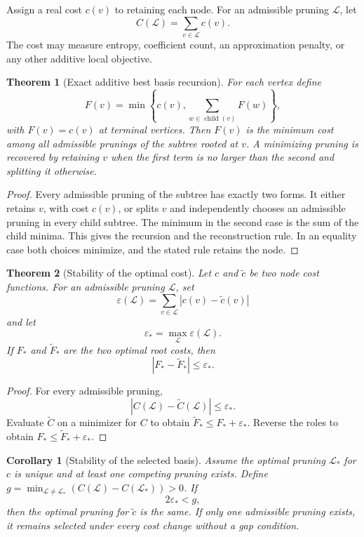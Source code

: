 \documentclass[11pt,letterpaper]{article}
\newtheorem{theorem}{Theorem}[section]
\theoremstyle{plain}
\theoremstyle{plain}
\theoremstyle{plain}
\newtheorem{corollary}[corollary]{Corollary}
\theoremstyle{definition}
\theoremstyle{definition}
\theoremstyle{definition}
\theoremstyle{definition}
\theoremstyle{remark}
\theoremstyle{remark}
\theoremstyle{remark}
\theoremstyle{remark}
\newcommand{\Lcal}{\mathcal L}
\begin{document}
Assign a real cost \(c(v)\) to retaining each node. For an admissible pruning \(\Lcal\), let
\[
C(\Lcal)=\sum_{v\in\Lcal}c(v).
\]
The cost may measure entropy, coefficient count, an approximation penalty, or any other additive local objective.

\begin{theorem}[Exact additive best basis recursion]\label{thm:best_basis}
For each vertex define
\[
F(v)
=
\min\left\{
 c(v),
 \sum_{w\in\operatorname{child}(v)}F(w)
\right\},
\]
with \(F(v)=c(v)\) at terminal vertices. Then \(F(v)\) is the minimum cost among all admissible prunings of the subtree rooted at \(v\). A minimizing pruning is recovered by retaining \(v\) when the first term is no larger than the second and splitting it otherwise.
\end{theorem}

\begin{proof}
Every admissible pruning of the subtree has exactly two forms. It either retains \(v\), with cost \(c(v)\), or splits \(v\) and independently chooses an admissible pruning in every child subtree. The minimum in the second case is the sum of the child minima. This gives the recursion and the reconstruction rule. In an equality case both choices minimize, and the stated rule retains the node.
\end{proof}

\begin{theorem}[Stability of the optimal cost]\label{thm:best_basis_cost_stability}
Let \(c\) and \(\widetilde c\) be two node cost functions. For an admissible pruning \(\Lcal\), set
\[
\varepsilon(\Lcal)
=
\sum_{v\in\Lcal}|c(v)-\widetilde c(v)|
\]
and let
\[
\varepsilon_*
=
\max_{\Lcal}\varepsilon(\Lcal).
\]
If \(F_*\) and \(\widetilde F_*\) are the two optimal root costs, then
\[
|F_*-\widetilde F_*|
\leq
\varepsilon_*.
\]
\end{theorem}

\begin{proof}
For every admissible pruning,
\[
|C(\Lcal)-\widetilde C(\Lcal)|
\leq
\varepsilon_*.
\]
Evaluate \(\widetilde C\) on a minimizer for \(C\) to obtain \(\widetilde F_*\leq F_*+\varepsilon_*\). Reverse the roles to obtain \(F_*\leq\widetilde F_*+\varepsilon_*\).
\end{proof}

\begin{corollary}[Stability of the selected basis]\label{cor:best_basis_selection_stability}
Assume the optimal pruning \(\Lcal_*\) for \(c\) is unique and at least one competing pruning exists. Define \(g=\min_{\Lcal\ne\Lcal_*}(C(\Lcal)-C(\Lcal_*))>0\). If
\[
2\varepsilon_*<g,
\]
then the optimal pruning for \(\widetilde c\) is the same. If only one admissible pruning exists, it remains selected under every cost change without a gap condition.
\end{corollary}
\end{document}
